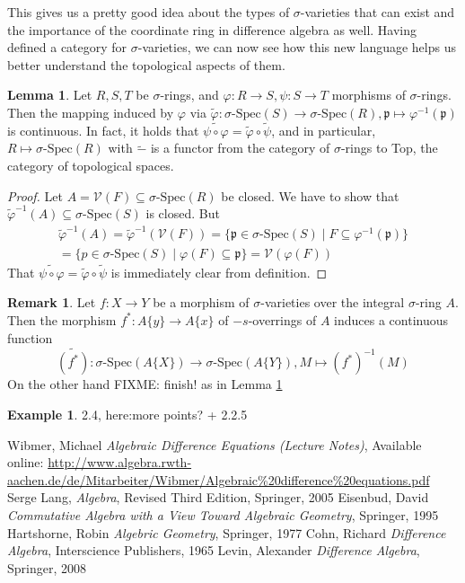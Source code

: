 \documentclass{article}
\def\V{\mathcal{V}}
\def\p{\mathfrak{p}}
\def\s{\sigma}
\def\sSpec{\sigma\text{-Spec}}
\newenvironment{bew}{\begin{proof}[Proof]}{\end{proof}}
\theoremstyle{definition}
\newtheorem{ex}[Satz]{Example}
\newtheorem{rem}[Satz]{Remark}
\newtheorem{lem}[Satz]{Lemma}
\begin{document}
This gives us a pretty good idea about the types of $\s$-varieties that can exist and the importance of the coordinate ring in difference algebra as well. 
Having defined a category for $\s$-varieties, we can now see how this new language helps us better understand the topological aspects of them.

\begin{lem}\label{inducedcont}
Let $R,S,T$ be $\s$-rings, and $\varphi: R \rightarrow S, \psi: S \rightarrow T$ morphisms of $\s$-rings. Then the mapping induced by $\varphi$ via $\tilde \varphi: \sSpec(S) \rightarrow \sSpec(R), \p \mapsto \varphi^{-1}(\p)$ is continuous. 
In fact, it holds that $\widetilde{ \psi \circ \varphi} = \tilde \varphi \circ \tilde \psi$, and in particular, $R \mapsto \sSpec(R)$ with $\tilde -$ is a functor from the category of $\s$-rings to Top, the category of topological spaces.
\begin{bew}
Let $A = \V(F) \subseteq \sSpec(R)$ be closed. We have to show that $\tilde \varphi^{-1}(A) \subseteq \sSpec(S)$ is closed.
But 
\begin{align*} \tilde \varphi^{-1}(A) = \tilde \varphi^{-1}(\V(F)) = \{ \p \in \sSpec(S) \mid F \subseteq \varphi^{-1}(\p) \} \\ = \{p \in \sSpec(S) \mid \varphi(F) \subseteq \p \} = \V(\varphi(F)) \end{align*}
That $\widetilde{ \psi \circ \varphi} = \tilde \varphi \circ \tilde \psi$ is immediately clear from definition.
\end{bew}
\end{lem}

\begin{rem}
Let $f: X \rightarrow Y$ be a morphism of $\s$-varieties over the integral $\s$-ring $A$. Then the morphism $f^*: A\{y\} \rightarrow A\{x\}$ of $-s$-overrings of $A$ induces a continuous function
\[ \tilde{(f^*)}: \sSpec(A\{X\}) \rightarrow \sSpec(A\{Y\}), M \mapsto (f^*)^{-1}(M) \]
On the other hand FIXME: finish!
as in Lemma \ref{inducedcont}
\end{rem}

\begin{ex}
2.4, here:more points? + 2.2.5

\end{ex}


\clearpage 
\begin{thebibliography}{9}
 Wibmer, Michael \emph{Algebraic Difference Equations (Lecture Notes)}, Available online: \url{http://www.algebra.rwth-aachen.de/de/Mitarbeiter/Wibmer/Algebraic\%20difference\%20equations.pdf}
 Serge Lang, \emph{Algebra}, Revised Third Edition, Springer, 2005
 Eisenbud, David \emph{Commutative Algebra with a View Toward Algebraic Geometry}, Springer, 1995
 Hartshorne, Robin \emph{Algebric Geometry}, Springer, 1977
 Cohn,  Richard \emph{Difference Algebra}, Interscience Publishers, 1965
 Levin, Alexander \emph{Difference Algebra}, Springer, 2008
\end{thebibliography}

\clearpage
\printindex
\end{document}
